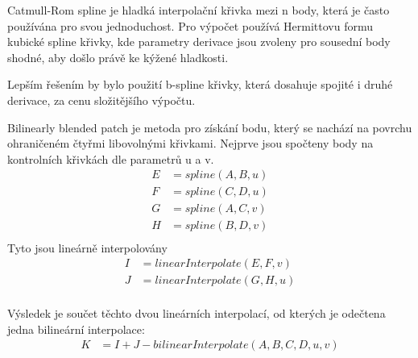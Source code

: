 \documentclass{zcu_sp}
\begin{document}
Catmull-Rom spline je hladká interpolační křivka mezi n body, která je často
používána pro svou jednoduchost. Pro výpočet používá Hermittovu formu kubické spline křivky, kde parametry derivace jsou zvoleny pro sousední body shodné, aby došlo právě ke kýžené hladkosti.

Lepším řešením by bylo použití b-spline křivky, která dosahuje spojité i druhé
derivace, za cenu složitějšího výpočtu.

Bilinearly blended patch je metoda pro získání bodu, který se nachází na povrchu ohraničeném čtyřmi libovolnými křivkami.
Nejprve jsou spočteny body na kontrolních křivkách dle parametrů u a v. 
\begin{align*}
E &= spline(A, B, u) \\
F &= spline(C, D, u) \\
G &= spline(A, C, v) \\
H &= spline(B, D, v) \\
\end{align*}
Tyto jsou lineárně interpolovány
\begin{align*}
I &= linearInterpolate(E, F, v) \\
J &= linearInterpolate(G, H, u) \\
\end{align*}

Výsledek je součet těchto dvou lineárních interpolací, od kterých je odečtena jedna bilineární interpolace:
\begin{align*}
K &= I + J - bilinearInterpolate(A, B, C, D, u, v) \\
\end{align*}
\end{document}
